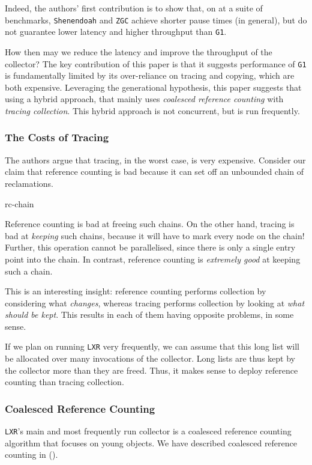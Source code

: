 Indeed, the authors' first contribution is to show that, on at a suite of benchmarks, \texttt{Shenendoah} and \texttt{ZGC} achieve shorter pause times (in general), but do not guarantee lower latency and higher throughput than \texttt{G1}.

How then may we reduce the latency and improve the throughput of the collector? The key contribution of this paper is that it suggests performance of \texttt{G1} is fundamentally limited by its over-reliance on tracing and copying, which are both expensive. Leveraging the generational hypothesis, this paper suggests that using a hybrid approach, that mainly uses \textit{coalesced reference counting} with \textit{tracing collection}. This hybrid approach is not concurrent, but is run frequently.

\subsubsection{The Costs of Tracing}
The authors argue that tracing, in the worst case, is very expensive. Consider our claim that reference counting is bad because it can set off an unbounded chain of reclamations.

\begin{center}
    {rc-chain}
\end{center}

Reference counting is bad at freeing such chains. On the other hand, tracing is bad at \textit{keeping} such chains, because it will have to mark every node on the chain! Further, this operation cannot be parallelised, since there is only a single entry point into the chain. In contrast, reference counting is \textit{extremely good} at keeping such a chain.

This is an interesting insight: reference counting performs collection by considering what \textit{changes}, whereas tracing performs collection by looking at \textit{what should be kept}. This results in each of them having opposite problems, in some sense.

If we plan on running \texttt{LXR} very frequently, we can assume that this long list will be allocated over many invocations of the collector. Long lists are thus kept by the collector more than they are freed. Thus, it makes sense to deploy reference counting than tracing collection.

\subsubsection{Coalesced Reference Counting}
\texttt{LXR}'s main and most frequently run collector is a coalesced reference counting algorithm that focuses on young objects. We have described coalesced reference counting in  (). 

